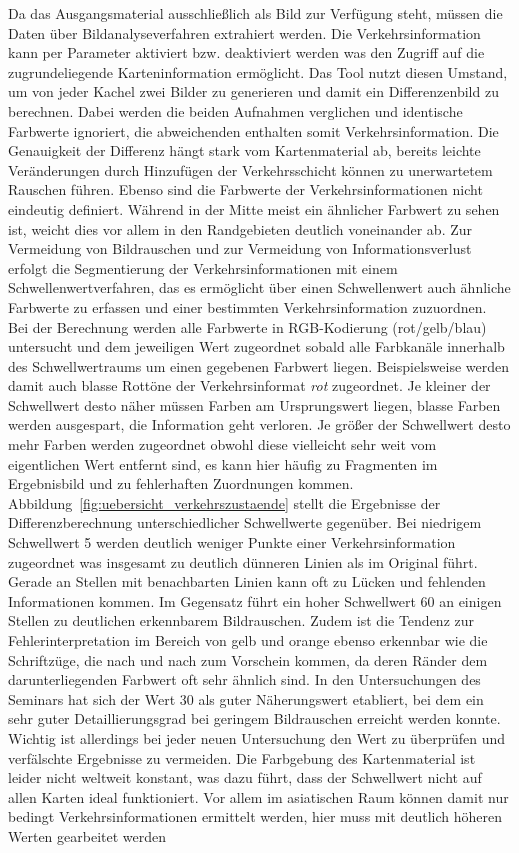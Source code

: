 Da das Ausgangsmaterial ausschließlich als Bild zur Verfügung steht, müssen die Daten über Bildanalyseverfahren extrahiert werden. Die Verkehrsinformation kann per Parameter aktiviert bzw. deaktiviert werden was den Zugriff auf die zugrundeliegende Karteninformation ermöglicht. Das Tool nutzt diesen Umstand, um von jeder Kachel zwei Bilder zu generieren und damit ein Differenzenbild zu berechnen. Dabei werden die beiden Aufnahmen verglichen und identische Farbwerte ignoriert, die abweichenden enthalten somit Verkehrsinformation. Die Genauigkeit der Differenz hängt stark vom Kartenmaterial ab, bereits leichte Veränderungen durch Hinzufügen der Verkehrsschicht können zu unerwartetem Rauschen führen. Ebenso sind die Farbwerte der Verkehrsinformationen nicht eindeutig definiert. Während in der Mitte meist ein ähnlicher Farbwert zu sehen ist, weicht dies vor allem in den Randgebieten deutlich voneinander ab. Zur Vermeidung von Bildrauschen und zur Vermeidung von Informationsverlust erfolgt die Segmentierung der Verkehrsinformationen mit einem Schwellenwertverfahren, das es ermöglicht über einen Schwellenwert auch ähnliche Farbwerte zu erfassen und einer bestimmten Verkehrsinformation zuzuordnen.\\

Bei der Berechnung werden alle Farbwerte in RGB-Kodierung (rot/gelb/blau) untersucht und dem jeweiligen Wert zugeordnet sobald alle Farbkanäle innerhalb des Schwellwertraums um einen gegebenen Farbwert liegen. Beispielsweise werden damit auch blasse Rottöne der Verkehrsinformat \textit{rot} zugeordnet. Je kleiner der Schwellwert desto näher müssen Farben am Ursprungswert liegen, blasse Farben werden ausgespart, die Information geht verloren. Je größer der Schwellwert desto mehr Farben werden zugeordnet obwohl diese vielleicht sehr weit vom eigentlichen Wert entfernt sind, es kann hier häufig zu Fragmenten im Ergebnisbild und zu fehlerhaften Zuordnungen kommen. Abbildung~\ref{fig:uebersicht_verkehrszustaende} stellt die Ergebnisse der Differenzberechnung unterschiedlicher Schwellwerte gegenüber. Bei niedrigem Schwellwert 5 werden deutlich weniger Punkte einer Verkehrsinformation zugeordnet was insgesamt zu deutlich dünneren Linien als im Original führt. Gerade an Stellen mit benachbarten Linien kann oft zu Lücken und fehlenden Informationen kommen. Im Gegensatz führt ein hoher Schwellwert 60 an einigen Stellen zu deutlichen erkennbarem Bildrauschen. Zudem ist die Tendenz zur Fehlerinterpretation im Bereich von gelb und orange ebenso erkennbar wie die Schriftzüge, die nach und nach zum Vorschein kommen, da deren Ränder dem darunterliegenden Farbwert oft sehr ähnlich sind. In den Untersuchungen des Seminars hat sich der Wert 30 als guter Näherungswert etabliert, bei dem ein sehr guter Detaillierungsgrad bei geringem Bildrauschen erreicht werden konnte. Wichtig ist allerdings bei jeder neuen Untersuchung den Wert zu überprüfen und verfälschte Ergebnisse zu vermeiden. Die Farbgebung des Kartenmaterial ist leider nicht weltweit konstant, was dazu führt, dass der Schwellwert nicht auf allen Karten ideal funktioniert. Vor allem im asiatischen Raum können damit nur bedingt Verkehrsinformationen ermittelt werden, hier muss mit deutlich höheren Werten gearbeitet werden\\

